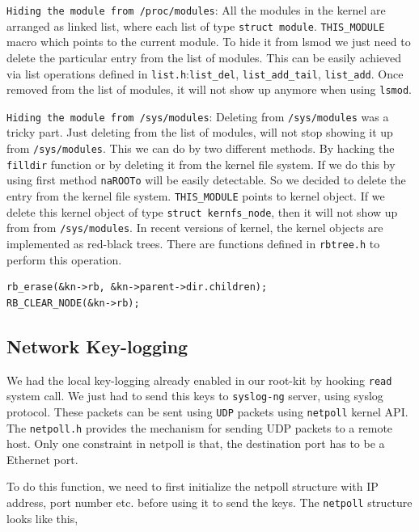 \documentclass[10pt, letterpaper]{scrartcl}
\begin{document}
\texttt{Hiding the module from /proc/modules}: All the modules in the kernel are arranged as linked list, 
where each list of type \texttt{struct module}. \texttt{THIS\_MODULE} macro which points to the current module. 
To hide it from lsmod we just need to delete the particular entry from the list of modules. 
This can be easily achieved via list operations defined in \texttt{list.h}:\texttt{list\_del}, 
\texttt{list\_add\_tail}, \texttt{list\_add}. Once removed from the list of modules, 
it will not show up anymore when using \texttt{lsmod}. 

\texttt{Hiding the module from /sys/modules}: Deleting from \texttt{/sys/modules} was a tricky part. 
Just deleting from the list of modules, will not stop showing it up from \texttt{/sys/modules}.
This we can do by two different methods. By hacking the \texttt{filldir} function or by deleting it from the 
kernel file system. If we do this by using first method \texttt{naROOTo} will be easily detectable. 
So we decided to delete the entry from the kernel file system. \texttt{THIS\_MODULE} points to kernel object. 
If we delete this kernel object of type \texttt{struct kernfs\_node}, then it will not show up from from \texttt{/sys/modules}. 
In recent versions of kernel, the kernel objects are implemented as red-black trees. 
There are functions defined in \texttt{rbtree.h} to perform this operation. 

\begin{verbatim}
rb_erase(&kn->rb, &kn->parent->dir.children);
RB_CLEAR_NODE(&kn->rb);
\end{verbatim}


\subsection{Network Key-logging}
We had the local key-logging already enabled in our root-kit by hooking \texttt{read} system call. 
We just had to send this keys to \texttt{syslog-ng} server, using syslog protocol. 
These packets can be sent using \texttt{UDP} packets using \texttt{netpoll} kernel API. 
The \texttt{netpoll.h} provides the mechanism for sending UDP packets to a remote host. 
Only one constraint in netpoll is that, the destination port has to be a Ethernet port. 

To do this function, we need to first initialize the netpoll structure with IP address, port number etc. 
before using it to send the keys. 
The \texttt{netpoll} structure looks like this, 
\end{document}
